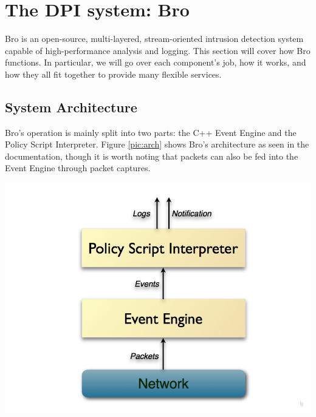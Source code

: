 

\chapter{The DPI system: Bro} \label{chap:bro}
Bro is an open-source, multi-layered, stream-oriented intrusion detection system capable of high-performance analysis and logging. This section will cover how Bro functions. In particular, we will go over each component's job, how it works, and how they all fit together to provide many flexible services.

\section{System Architecture}
Bro's operation is mainly split into two parts: the C++ Event Engine  and the Policy Script Interpreter. Figure \ref{pic:arch} shows Bro's architecture as seen in the documentation, though it is worth noting that packets can also be fed into the Event Engine through packet captures. \\


\begin{minipage}[c]{\textwidth}
\centering
\includegraphics[scale=0.3]{Figures/architecture.png}
\label{pic:arch}
\end{minipage} \\



